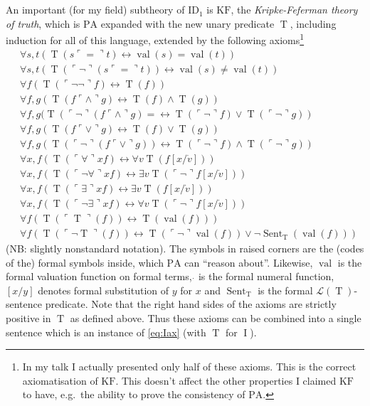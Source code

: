 \documentclass{scrartcl}
\theoremstyle{definition}
\theoremstyle{plain}
\theoremstyle{remark}
\DeclareMathOperator{\T}{T}
\newcommand{\liff}{\leftrightarrow}
\renewcommand{\=}{=\!\!\!=}
\newcommand{\num}[1]{\ensuremath{\dot{#1}}}
\newcommand{\GN}[1]{\ensuremath{\ulcorner #1 \urcorner}}
\newcommand{\PA}{\ensuremath{\mathrm{PA}}}
\renewcommand{\L}{\ensuremath{\mathcal{L}}}
\DeclareMathOperator{\val}{val}
\DeclareMathOperator{\Sent}{Sent}
\DeclareMathOperator{\I}{I}
\newcommand{\ID}[2][]{\ensuremath{\widehat{\mathrm{ID}}_{#2}^{#1}}}
\newcommand{\KF}{\ensuremath{\mathrm{KF}}}
\begin{document}
An important (for my field) subtheory of $\ID1$ is $\KF$, the \emph{Kripke-Feferman theory of truth}, which is $\PA$ expanded with the new unary predicate $\T$, including induction for all of this language, extended by the following axioms\footnote{In my talk I actually presented only half of these axioms. This is the correct axiomatisation of $\KF$. This doesn't affect the other properties I claimed $\KF$ to have, e.g.~the ability to prove the consistency of $\PA$.}
\begin{align}
  &\forall s,t (\T(s \GN{=} t) \liff \val(s) = \val(t))\\
  &\forall s,t (\T(\GN{\neg} (s \GN{=} t)) \liff \val(s) \not= \val(t))\\
  &\forall f (\T(\GN{\neg \neg} f) \liff \T(f))\\
  &\forall f,g (\T(f \GN{\land} g) \liff \T(f) \land \T(g))\\
  &\forall f,g (\T(\GN{\neg} (f \GN{\land} g)= \liff \T(\GN{\neg} f) \lor \T(\GN{\neg} g))\\
  &\forall f,g (\T(f \GN{\lor} g) \liff \T(f) \lor \T(g))\\
  &\forall f,g (\T(\GN{\neg} (f \GN{\lor} g)) \liff \T(\GN{\neg} f) \land \T(\GN{\neg} g))\\
  &\forall x,f (\T(\GN{\forall} x f) \liff \forall v \T(f[x/\num{v}]))\\
  &\forall x,f (\T(\GN{\neg \forall} x f) \liff \exists v \T(\GN{\neg} f[x/\num{v}]))\\
  &\forall x,f (\T(\GN{\exists} x f) \liff \exists v \T(f[x/\num{v}]))\\
  &\forall x,f (\T(\GN{\neg \exists} x f) \liff \forall v \T(\GN{\neg} f[x/\num{v}]))\\
  &\forall f (\T(\GN{\T}(f)) \liff \T(\val(f)))\\
  &\forall f (\T(\GN{\neg \T}(f)) \liff \T(\GN{\neg} \val(f)) \lor \neg \Sent_{\T}(\val(f)))
\end{align}
(NB: slightly nonstandard notation). The symbols in raised corners are the (codes of the) formal symbols inside, which $\PA$ can ``reason about''. Likewise, $\val$ is the formal valuation function on formal terms, $\num{}$ is the formal numeral function, $[x/y]$ denotes formal substitution of $y$ for $x$ and $\Sent_{\T}$ is the formal $\L(\T)$-sentence predicate. Note that the right hand sides of the axioms are strictly positive in $\T$ as defined above. Thus these axioms can be combined into a single sentence which is an instance of \eqref{eq:Iax} (with $\T$ for $\I$).
\end{document}
